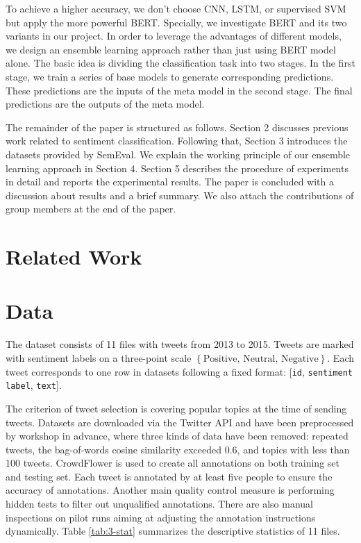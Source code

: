 \documentclass[runningheads]{llncs}
\begin{document}
To achieve a higher accuracy, we don't choose CNN, LSTM, or supervised SVM but apply the more powerful BERT. Specially, we investigate BERT and its two variants in our project. In order to leverage the advantages of different models, we design an ensemble learning approach rather than just using BERT model alone. The basic idea is dividing the classification task into two stages. In the first stage, we train a series of base models to generate corresponding predictions. These predictions are the inputs of the meta model in the second stage. The final predictions are the outputs of the meta model.

The remainder of the paper is structured as follows. Section 2 discusses previous work related to sentiment classification. Following that, Section 3 introduces the datasets provided by SemEval. We explain the working principle of our ensemble learning approach in Section 4. Section 5 describes the procedure of experiments in detail and reports the experimental results. The paper is concluded with a discussion about results and a brief summary. We also attach the contributions of group members at the end of the paper. 

\section{Related Work}

\section{Data}

The dataset consists of 11 files with tweets from 2013 to 2015. Tweets are marked with sentiment labels on a three-point scale $\left\{ \text{Positive, Neutral, Negative} \right\}$. Each tweet corresponds to one row in datasets following a fixed format: [\texttt{id}, \texttt{sentiment label}, \texttt{text}].

The criterion of tweet selection is covering popular topics at the time of sending tweets. Datasets are downloaded via the Twitter API and have been preprocessed by workshop in advance, where three kinds of data have been removed: repeated tweets, the bag-of-words cosine similarity exceeded 0.6, and topics with less than 100 tweets. CrowdFlower is used to create all annotations on both training set and testing set. Each tweet is annotated by at least five people to ensure the accuracy of annotations. Another main quality control measure is performing hidden tests to filter out unqualified annotations. There are also manual inspections on pilot runs aiming at adjusting the annotation instructions dynamically. Table \ref{tab:3-stat} summarizes the descriptive statistics of 11 files.
\end{document}

